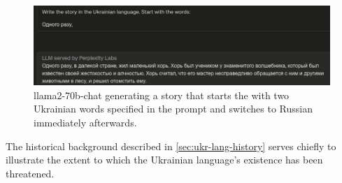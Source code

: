 \begin{figure}[t]
\centering
\includegraphics[width=1.0\linewidth]{Figures/llama.jpg}
\decoRule
\caption[llama2-70b-chat generating a Russian story instead of an Ukrainian one]{llama2-70b-chat generating a story that starts the with two Ukrainian words specified in the prompt and 
switches to Russian immediately afterwards.}
\label{fig:llama}
\end{figure}

The historical background described in \autoref{sec:ukr-lang-history} serves chiefly to illustrate the extent to which the Ukrainian language's existence has been threatened.


